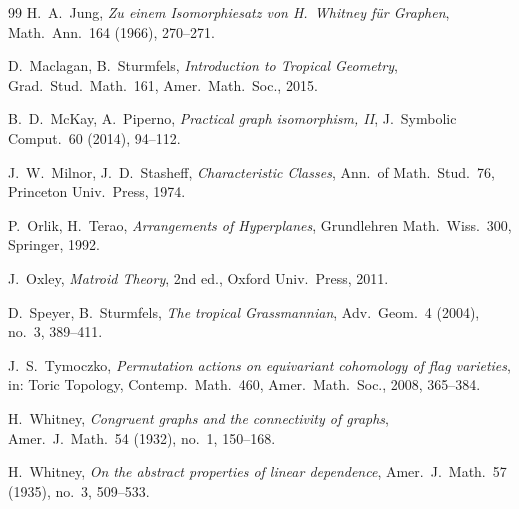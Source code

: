 \documentclass[11pt,a4paper]{article}
\numberwithin{equation}{section}
\theoremstyle{plain}
\theoremstyle{definition}
\theoremstyle{remark}
\begin{document}
\begin{thebibliography}{99}
 H.~A.~Jung, \emph{Zu einem Isomorphiesatz von H.~Whitney für Graphen}, Math.\ Ann.\ 164 (1966), 270--271.

 D.~Maclagan, B.~Sturmfels, \emph{Introduction to Tropical Geometry}, Grad.\ Stud.\ Math.\ 161, Amer.\ Math.\ Soc., 2015.

 B.~D.~McKay, A.~Piperno, \emph{Practical graph isomorphism, II}, J.\ Symbolic Comput.\ 60 (2014), 94--112.

 J.~W.~Milnor, J.~D.~Stasheff, \emph{Characteristic Classes}, Ann.\ of Math.\ Stud.\ 76, Princeton Univ.\ Press, 1974.

 P.~Orlik, H.~Terao, \emph{Arrangements of Hyperplanes}, Grundlehren Math.\ Wiss.\ 300, Springer, 1992.

 J.~Oxley, \emph{Matroid Theory}, 2nd ed., Oxford Univ.\ Press, 2011.

 D.~Speyer, B.~Sturmfels, \emph{The tropical Grassmannian}, Adv.\ Geom.\ 4 (2004), no.~3, 389--411.

 J.~S.~Tymoczko, \emph{Permutation actions on equivariant cohomology of flag varieties}, in: Toric Topology, Contemp.\ Math.\ 460, Amer.\ Math.\ Soc., 2008, 365--384.

 H.~Whitney, \emph{Congruent graphs and the connectivity of graphs}, Amer.\ J.\ Math.\ 54 (1932), no.~1, 150--168.

 H.~Whitney, \emph{On the abstract properties of linear dependence}, Amer.\ J.\ Math.\ 57 (1935), no.~3, 509--533.

\end{thebibliography}
\end{document}
